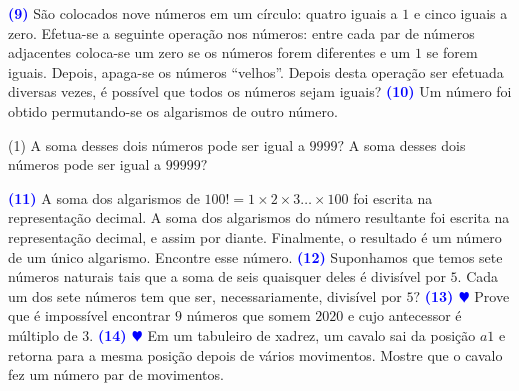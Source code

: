 \documentclass[12pt, a4paper]{article}
\newcommand{\negrito}[1]{\mbox{\boldmath{$#1$}}}
\begin{document}
\textcolor{blue}{\bf(9)} São colocados nove números em um círculo: quatro iguais a $1$ e cinco iguais a zero. Efetua-se a seguinte operação nos números: entre cada par de números adjacentes coloca-se um zero se os números forem diferentes e um $1$ se forem iguais. Depois, apaga-se os números ``velhos''. Depois desta operação ser efetuada diversas vezes, é possível que todos os números sejam iguais?
\newline
\newline
\textcolor{blue}{\bf(10)} Um número foi obtido permutando-se os algarismos de outro número.
\begin{tasks}[counter-format={(tsk[a])},label-width=3.6ex, label-format = {\bfseries}, column-sep = {0pt}](1)
\task[\textcolor{Floresta}{$\negrito{(a)} $}] A soma desses dois números pode ser igual a $9999?$
\task[\textcolor{Floresta}{$\negrito{(b)} $}] A soma desses dois números pode ser igual a $99999?$
\end{tasks}

\textcolor{blue}{\bf(11)} A soma dos algarismos de $100! = 1 \times 2 \times 3 \ldots \times 100$  foi escrita na representação decimal. A soma dos algarismos do número resultante foi escrita na representação decimal, e assim por diante. Finalmente, o resultado é um número de um único algarismo. Encontre esse número.
\newline\newline
\textcolor{blue}{\bf(12)} Suponhamos que temos sete números naturais tais que a soma de seis quaisquer deles é divisível por $5.$ Cada um dos sete números tem que ser, necessariamente, divisível por $5?$\newline \newline
\textcolor{blue}{\bf(13) $\varheart$} Prove que é impossível encontrar $9$ números que somem $2020$ e cujo antecessor é múltiplo de $3.$ 
\newline\newline
\textcolor{blue}{\bf(14) $\varheart$} Em um tabuleiro de xadrez, um cavalo sai da posição $a1$ e retorna para a mesma posição depois de vários movimentos. Mostre que o cavalo fez um número par de movimentos.
 
\end{document}
